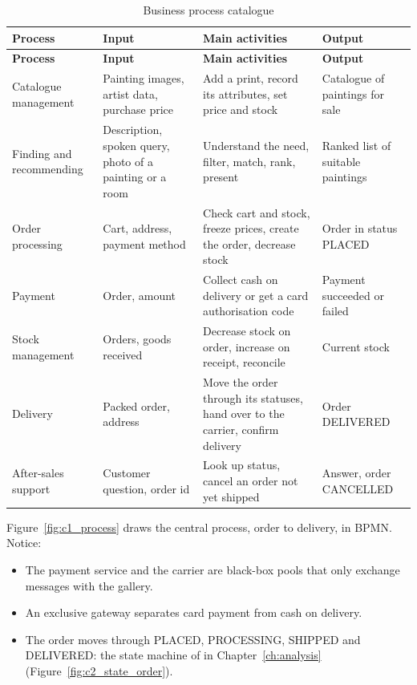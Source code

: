 \begin{longtable}{@{}P{2.9cm}P{3.0cm}P{5.5cm}P{3.6cm}@{}}
\caption{Business process catalogue}\label{tab:processes}\\
\toprule
\textbf{Process} & \textbf{Input} & \textbf{Main activities} & \textbf{Output}\\
\midrule
\endfirsthead
\toprule
\textbf{Process} & \textbf{Input} & \textbf{Main activities} & \textbf{Output}\\
\midrule
\endhead
\small Catalogue management & \small Painting images, artist data, purchase price & \small Add a print, record its attributes, set price and stock & \small Catalogue of paintings for sale\\
\small Finding and recommending & \small Description, spoken query, photo of a painting or a room & \small Understand the need, filter, match, rank, present & \small Ranked list of suitable paintings\\
\small Order processing & \small Cart, address, payment method & \small Check cart and stock, freeze prices, create the order, decrease stock & \small Order in status PLACED\\
\small Payment & \small Order, amount & \small Collect cash on delivery or get a card authorisation code & \small Payment succeeded or failed\\
\small Stock management & \small Orders, goods received & \small Decrease stock on order, increase on receipt, reconcile & \small Current stock\\
\small Delivery & \small Packed order, address & \small Move the order through its statuses, hand over to the carrier, confirm delivery & \small Order DELIVERED\\
\small After-sales support & \small Customer question, order id & \small Look up status, cancel an order not yet shipped & \small Answer, order CANCELLED\\
\bottomrule
\end{longtable}

Figure~\ref{fig:c1_process} draws the central process, order to delivery, in BPMN. Notice:
\begin{itemize}
\item The payment service and the carrier are black-box pools that only exchange messages with the gallery.
\item An exclusive gateway separates card payment from cash on delivery.
\item The order moves through PLACED, PROCESSING, SHIPPED and DELIVERED: the state machine of  in
      Chapter~\ref{ch:analysis} (Figure~\ref{fig:c2_state_order}).
\end{itemize}

